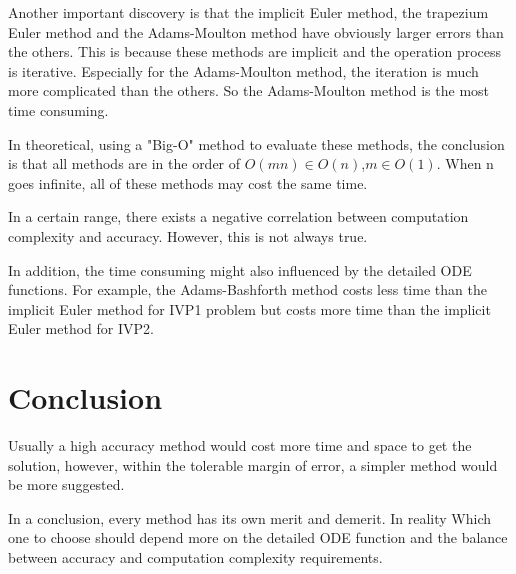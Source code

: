 \documentclass[a4paper]{article}
\begin{document}
    Another important discovery is that the implicit Euler method, the trapezium Euler method and the Adams-Moulton method have obviously larger errors than the others. This is because these methods are implicit and the operation process is iterative. Especially for the Adams-Moulton method, the iteration is much more complicated than the others. So the Adams-Moulton method is the most time consuming.
    
    In theoretical, using a "Big-O" method to evaluate these methods, the conclusion is that all methods are in the order of $O(mn)\in{O(n)}$,$m\in{O(1)}$. When n goes infinite, all of these methods may cost the same time. 
    
    In a certain range, there exists a negative correlation between computation complexity and accuracy. However, this is not always true.
    
    In addition, the time consuming might also influenced by the detailed ODE functions. For example, the Adams-Bashforth method costs less time than the implicit Euler method for IVP1 problem but costs more time than the implicit Euler method for IVP2.
    
    
    \section{Conclusion}
    
	Usually a high accuracy method would cost more time and space to get the solution, however, within the tolerable margin of error, a simpler method would be more suggested.
	
	In a conclusion, every method has its own merit and demerit.	
	In reality Which one to choose should depend more on the detailed ODE function and the balance between accuracy and computation complexity requirements.
	
	
    \clearpage
\end{document}
